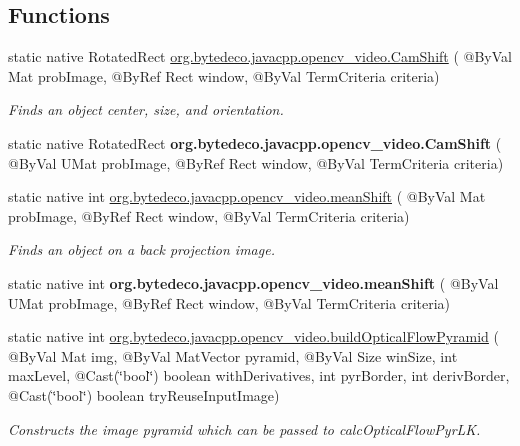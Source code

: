 \subsection*{Functions}
\begin{DoxyCompactItemize}
\item 
static native Rotated\+Rect \hyperlink{group__video__track_ga813283f225d7c4ce103da8b37981c69e}{org.\+bytedeco.\+javacpp.\+opencv\+\_\+video.\+Cam\+Shift} ( @By\+Val Mat prob\+Image, @By\+Ref Rect window, @By\+Val Term\+Criteria criteria)
\begin{DoxyCompactList}\small\item\em Finds an object center, size, and orientation. \end{DoxyCompactList}\item 
\mbox{\label{group__video__track_gaba49e224f6ca0cac24adb518aa3d8711}} 
static native Rotated\+Rect {\bfseries org.\+bytedeco.\+javacpp.\+opencv\+\_\+video.\+Cam\+Shift} ( @By\+Val U\+Mat prob\+Image, @By\+Ref Rect window, @By\+Val Term\+Criteria criteria)
\item 
static native int \hyperlink{group__video__track_gad3336224aac304be4ee36ef146ec40d8}{org.\+bytedeco.\+javacpp.\+opencv\+\_\+video.\+mean\+Shift} ( @By\+Val Mat prob\+Image, @By\+Ref Rect window, @By\+Val Term\+Criteria criteria)
\begin{DoxyCompactList}\small\item\em Finds an object on a back projection image. \end{DoxyCompactList}\item 
\mbox{\label{group__video__track_ga03fda94674ccaef2a6eaf5b1744faf7d}} 
static native int {\bfseries org.\+bytedeco.\+javacpp.\+opencv\+\_\+video.\+mean\+Shift} ( @By\+Val U\+Mat prob\+Image, @By\+Ref Rect window, @By\+Val Term\+Criteria criteria)
\item 
static native int \hyperlink{group__video__track_gafca5a72a408befa96e624e9d9704303b}{org.\+bytedeco.\+javacpp.\+opencv\+\_\+video.\+build\+Optical\+Flow\+Pyramid} ( @By\+Val Mat img, @By\+Val Mat\+Vector pyramid, @By\+Val Size win\+Size, int max\+Level, @Cast(\char`\"{}bool\char`\"{}) boolean with\+Derivatives, int pyr\+Border, int deriv\+Border, @Cast(\char`\"{}bool\char`\"{}) boolean try\+Reuse\+Input\+Image)
\begin{DoxyCompactList}\small\item\em Constructs the image pyramid which can be passed to calc\+Optical\+Flow\+Pyr\+LK. \end{DoxyCompactList}\item 

\end{DoxyCompactItemize}
